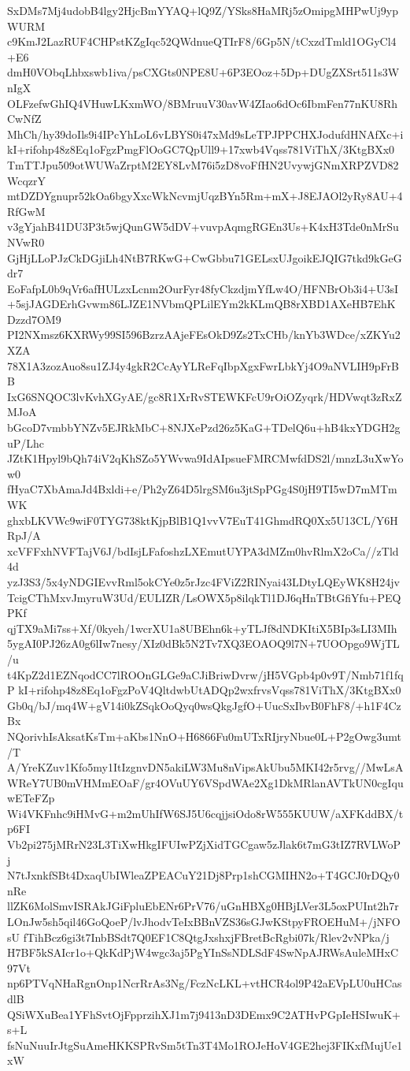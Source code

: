 SxDMs7Mj4udobB4lgy2HjcBmYYAQ+lQ9Z/YSks8HaMRj5zOmipgMHPwUj9ypWURM
c9KmJ2LazRUF4CHPstKZgIqc52QWdnueQTIrF8/6Gp5N/tCxzdTmld1OGyCl4+E6
dmH0VObqLhbxswb1iva/psCXGts0NPE8U+6P3EOoz+5Dp+DUgZXSrt511s3WnIgX
OLFzefwGhIQ4VHuwLKxmWO/8BMruuV30avW4ZIao6dOc6IbmFen77nKU8RhCwNfZ
MhCh/hy39doIls9i4IPcYhLoL6vLBYS0i47xMd9sLeTPJPPCHXJodufdHNAfXc+i
kI+rifohp48z8Eq1oFgzPmgFlOoGC7QpUll9+17xwb4Vqss781ViThX/3KtgBXx0
TmTTJpu509otWUWaZrptM2EY8LvM76i5zD8voFfHN2UvywjGNmXRPZVD82WcqzrY
mtDZDYgnupr52kOa6bgyXxcWkNcvmjUqzBYn5Rm+mX+J8EJAOl2yRy8AU+4RfGwM
v3gYjahB41DU3P3t5wjQunGW5dDV+vuvpAqmgRGEn3Us+K4xH3Tde0nMrSuNVwR0
GjHjLLoPJzCkDGjiLh4NtB7RKwG+CwGbbu71GELsxUJgoikEJQIG7tkd9kGeGdr7
EoFafpL0b9qVr6afHULzxLcnm2OurFyr48fyCkzdjmYfLw4O/HFNBrOb3i4+U3sI
+5sjJAGDErhGvwm86LJZE1NVbmQPLilEYm2kKLmQB8rXBD1AXeHB7EhKDzzd7OM9
PI2NXmsz6KXRWy99SI596BzrzAAjeFEsOkD9Zs2TxCHb/knYb3WDce/xZKYu2XZA
78X1A3zozAuo8su1ZJ4y4gkR2CcAyYLReFqIbpXgxFwrLbkYj4O9aNVLIH9pFrBB
IxG6SNQOC3lvKvhXGyAE/gc8R1XrRvSTEWKFcU9rOiOZyqrk/HDVwqt3zRxZMJoA
bGcoD7vmbbYNZv5EJRkMbC+8NJXePzd26z5KaG+TDelQ6u+hB4kxYDGH2guP/Lhc
JZtK1Hpyl9bQh74iV2qKhSZo5YWvwa9IdAIpsueFMRCMwfdDS2l/mnzL3uXwYow0
fHyaC7XbAmaJd4Bxldi+e/Ph2yZ64D5lrgSM6u3jtSpPGg4S0jH9TI5wD7mMTmWK
ghxbLKVWc9wiF0TYG738ktKjpBlB1Q1vvV7EuT41GhmdRQ0Xx5U13CL/Y6HRpJ/A
xcVFFxhNVFTajV6J/bdIsjLFafoshzLXEmutUYPA3dMZm0hvRlmX2oCa//zTld4d
yzJ3S3/5x4yNDGIEvvRml5okCYe0z5rJzc4FViZ2RINyai43LDtyLQEyWK8H24jv
TcigCThMxvJmyruW3Ud/EULIZR/LsOWX5p8ilqkTl1DJ6qHnTBtGfiYfu+PEQPKf
qjTX9aMi7ss+Xf/0kyeh/1wcrXU1a8UBEhn6k+yTLJf8dNDKItiX5BIp3sLI3MIh
5ygAI0PJ26zA0g6lIw7nesy/XIz0dBk5N2Tv7XQ3EOAOQ9l7N+7UOOpgo9WjTL/u
t4KpZ2d1EZNqodCC7lROOnGLGe9aCJiBriwDvrw/jH5VGpb4p0v9T/Nmb71f1fqP
kI+rifohp48z8Eq1oFgzPoV4QltdwbUtADQp2wxfrvsVqss781ViThX/3KtgBXx0
Gb0q/bJ/mq4W+gV14i0kZSqkOoQyq0wsQkgJgfO+UucSxIbvB0FhF8/+h1F4CzBx
NQorivhIsAksatKsTm+aKbs1NnO+H6866Fu0mUTxRIjryNbue0L+P2gOwg3umt/T
A/YreKZuv1Kfo5my1ItIzgnvDN5akiLW3Mu8nVipsAkUbu5MKI42r5rvg//MwLsA
WReY7UB0mVHMmEOaF/gr4OVuUY6VSpdWAe2Xg1DkMRlanAVTkUN0cgIquwETeFZp
Wi4VKFnhc9iHMvG+m2mUhIfW6SJ5U6cqjjsiOdo8rW555KUUW/aXFKddBX/tp6FI
Vb2pi275jMRrN23L3TiXwHkgIFUIwPZjXidTGCgaw5zJlak6t7mG3tIZ7RVLWoPj
N7tJxnkfSBt4DxaqUbIWleaZPEACuY21Dj8Prp1shCGMIHN2o+T4GCJ0rDQy0nRe
llZK6MolSmvISRAkJGiFpluEbENr6PrV76/uGnHBXg0HBjLVer3L5oxPUInt2h7r
LOnJw5sh5qil46GoQoeP/lvJhodvTeIxBBnVZS36sGJwKStpyFROEHuM+/jNFOsU
fTihBcz6gi3t7InbBSdt7Q0EF1C8QtgJxshxjFBretBcRgbi07k/Rlev2vNPka/j
H7BF5kSAIcr1o+QkKdPjW4wgc3aj5PgYInSsNDLSdF4SwNpAJRWsAuleMHxC97Vt
np6PTVqNHaRgnOnp1NcrRrAs3Ng/FczNcLKL+vtHCR4ol9P42aEVpLU0uHCasdlB
QSiWXuBea1YFhSvtOjFpprzihXJ1m7j9413nD3DEmx9C2ATHvPGpIeHSIwuK+s+L
fsNuNuuIrJtgSuAmeHKKSPRvSm5tTn3T4Mo1ROJeHoV4GE2hej3FIKxfMujUe1xW

